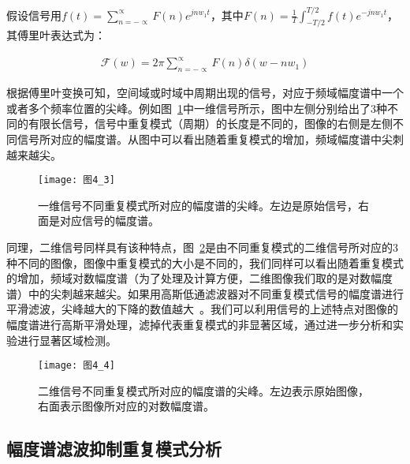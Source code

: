 假设信号用$f(t)=\sum_{n=-\propto}^{\propto}F(n)e^{jnw_{1}t}$，其中$F(n)=\frac{1}{T}\int_{-T/2}^{T/2}f(t)e^{-jnw_{1}t}$，其傅里叶表达式为：
\begin{linenomath}
\begin{align}
\mathcal{F}(w)=2\pi\sum_{n=-\propto}^{\propto}F(n)\delta(w-nw_{1})
\label{式4_1}
\end{align}
\end{linenomath}
根据傅里叶变换可知，空间域或时域中周期出现的信号，对应于频域幅度谱中一个或者多个频率位置的尖峰。例如图~\ref{图4_3}中一维信号所示，图中左侧分别给出了3种不同的有限长信号，信号中重复模式（周期）的长度是不同的，图像的右侧是左侧不同信号所对应的幅度谱。从图中可以看出随着重复模式的增加，频域幅度谱中尖刺越来越尖。
\begin{figure}[h]
  \centering
  \texttt{[image: 图4\_3]}
  \caption{一维信号不同重复模式所对应的幅度谱的尖峰。左边是原始信号，右面是对应信号的幅度谱。}   
  \label{图4_3} 
\end{figure}
同理，二维信号同样具有该种特点，图~\ref{图4_4}是由不同重复模式的二维信号所对应的3种不同的图像，图像中重复模式的大小是不同的，我们同样可以看出随着重复模式的增加，频域对数幅度谱（为了处理及计算方便，二维图像我们取的是对数幅度谱）中的尖刺越来越尖。如果用高斯低通滤波器对不同重复模式信号的幅度谱进行平滑滤波，尖峰越大的下降的数值越大~\cite{LiJianTPAMI2013Scale}。我们可以利用信号的上述特点对图像的幅度谱进行高斯平滑处理，滤掉代表重复模式的非显著区域，通过进一步分析和实验进行显著区域检测。
\begin{figure}[h]
  \centering
  \texttt{[image: 图4\_4]}
  \caption{二维信号不同重复模式所对应的幅度谱的尖峰。左边表示原始图像，右面表示图像所对应的对数幅度谱。}   
  \label{图4_4} 
\end{figure}

\subsection{幅度谱滤波抑制重复模式分析}
\label{4_1_2}

